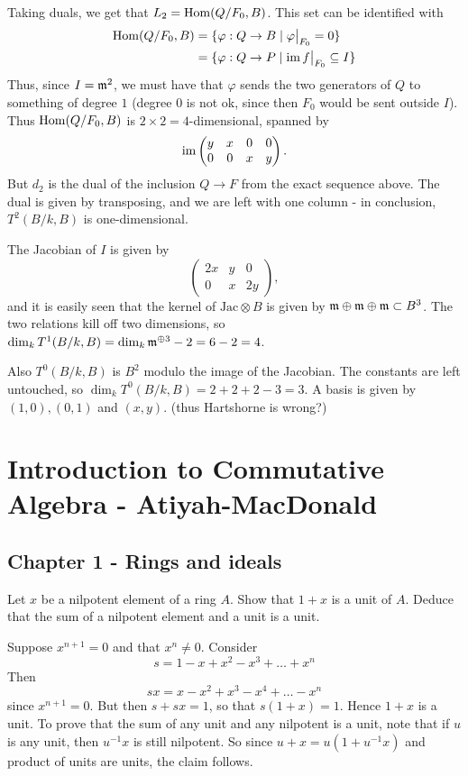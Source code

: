 \documentclass[11pt, english]{article}
\begin{document}
\begin{sol}
Taking duals, we get that $L_2 = \operatorname{Hom}(Q/F_0,B)$. This set can be identified with
\begin{align*}
\Hom(Q/F_0,B) &= \{ \varphi: Q \to B \mid \restr{\varphi}{F_0} = 0 \} \\
&= \{ \varphi: Q \to P \mid \im \restr{f}{F_0} \subseteq I \}
\end{align*}
Thus, since $I= \mathfrak{m}^2$, we must have that $\varphi$ sends the two generators of $Q$ to something of degree $1$ (degree $0$ is not ok, since then $F_0$ would be sent outside $I$). Thus $\operatorname{Hom}(Q/F_0,B)$ is $2 \times 2=4$-dimensional, spanned by 
\[
\operatorname{im} 
\begin{pmatrix}
  y & x & 0 & 0 \\
0 & 0 & x & y
\end{pmatrix}.
\]
But $d_2$ is the dual of the inclusion $Q \to F$ from the exact sequence above. The dual is given by transposing, and we are left with one column - in conclusion, $T^2(B/k,B)$ is one-dimensional.

The Jacobian of $I$ is given by
\[
\begin{pmatrix}
  2x & y & 0 \\
0 & x & 2y 
\end{pmatrix},
\]
and it is easily seen that the kernel of $\text{Jac} \otimes B$ is given by $\mathfrak{m} \oplus \mathfrak{m} \oplus \mathfrak{m} \subset B^3$. The two relations kill off two dimensions, so $\dim_k T^1(B/k,B) = \dim_k \mathfrak{m}^{\oplus 3} - 2 = 6-2=4$.

Also $T^0(B/k,B)$ is $B^2$ modulo the image of the Jacobian. The constants are left untouched, so $\dim_k T^0(B/k,B) = 2+2+2-3=3$. A basis is given by $(1,0),(0,1)$ and $(x,y)$. (thus Hartshorne is wrong?)
\end{sol}

\section{Introduction to Commutative Algebra - Atiyah-MacDonald}

\subsection{Chapter 1 - Rings and ideals}

\begin{exc}
Let $x$ be a nilpotent element of a ring $A$. Show that $1+x$ is a unit of $A$. Deduce that the sum of a nilpotent element and a unit is a unit.
\end{exc}
\begin{sol}
Suppose $x^{n+1}=0$ and that $x^n \neq 0$. Consider
\[
s = 1-x+x^2-x^3+\ldots+x^n
\]
Then
\[
sx = x-x^2+x^3-x^4+\ldots-x^n
\]
since $x^{n+1}=0$. But then $s+sx=1$, so that $s(1+x)=1$. Hence $1+x$ is a unit. To prove that the sum of any unit and any nilpotent is a unit, note that if $u$ is any unit, then $u^{-1}x$ is still nilpotent. So since $u+x=u(1+u^{-1}x)$ and product of units are units, the claim follows.
\end{sol}
\end{document}
